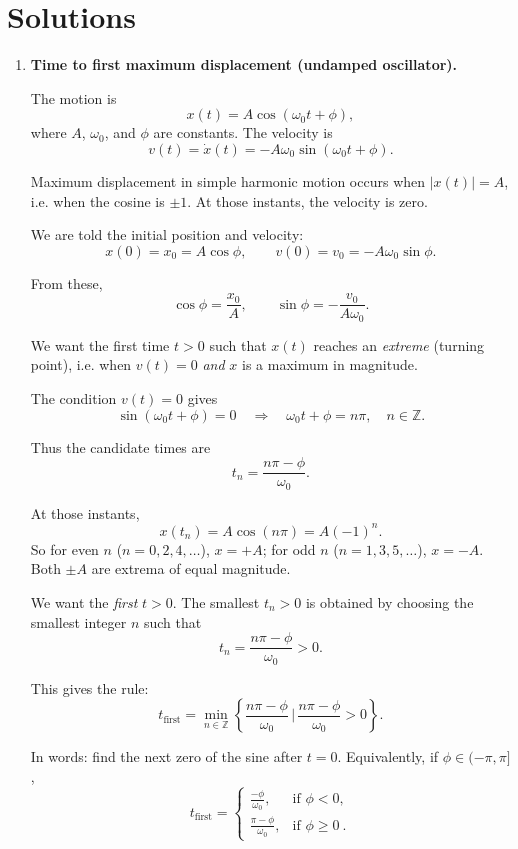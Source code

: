 \documentclass[../main.tex]{subfiles}
\begin{document}
\maketitle

\section*{Solutions}

\begin{enumerate}

\item \textbf{Time to first maximum displacement (undamped oscillator).}

The motion is
\[
x(t) = A \cos(\omega_0 t + \phi),
\]
where $A$, $\omega_0$, and $\phi$ are constants. The velocity is
\[
v(t) = \dot{x}(t) = -A \omega_0 \sin(\omega_0 t + \phi).
\]

Maximum displacement in simple harmonic motion occurs when $|x(t)| = A$, i.e. when the cosine is $\pm 1$. At those instants, the velocity is zero.

We are told the initial position and velocity:
\[
x(0) = x_0 = A \cos \phi,
\qquad
v(0) = v_0 = -A \omega_0 \sin \phi.
\]

From these,
\[
\cos \phi = \frac{x_0}{A},
\qquad
\sin \phi = - \frac{v_0}{A \omega_0}.
\]

We want the first time $t>0$ such that $x(t)$ reaches an \emph{extreme} (turning point), i.e. when $v(t)=0$ \emph{and} $x$ is a maximum in magnitude.

The condition $v(t)=0$ gives
\[
\sin(\omega_0 t + \phi) = 0
\quad \Longrightarrow \quad
\omega_0 t + \phi = n\pi,
\quad n \in \mathbb{Z}.
\]

Thus the candidate times are
\[
t_n = \frac{n\pi - \phi}{\omega_0}.
\]

At those instants,
\[
x(t_n) = A \cos(n\pi) = A(-1)^n.
\]
So for even $n$ ($n=0,2,4,\dots$), $x = +A$; for odd $n$ ($n=1,3,5,\dots$), $x = -A$. Both $\pm A$ are extrema of equal magnitude.

We want the \emph{first} $t>0$. The smallest $t_n>0$ is obtained by choosing the smallest integer $n$ such that
\[
t_n = \frac{n\pi - \phi}{\omega_0} > 0.
\]

This gives the rule:
\[
t_{\text{first}} = \min_{n \in \mathbb{Z}} \left\{ \frac{n\pi - \phi}{\omega_0} \, \Big| \, \frac{n\pi - \phi}{\omega_0} > 0 \right\}.
\]

In words: find the next zero of the sine after $t=0$. Equivalently, if $\phi \in (-\pi,\pi]$,
\[
t_{\text{first}} =
\begin{cases}
\displaystyle \frac{-\phi}{\omega_0}, & \text{if } \phi < 0, \\[1em]
\displaystyle \frac{\pi - \phi}{\omega_0}, & \text{if } \phi \ge 0~.
\end{cases}
\]


\end{enumerate}
\end{document}
